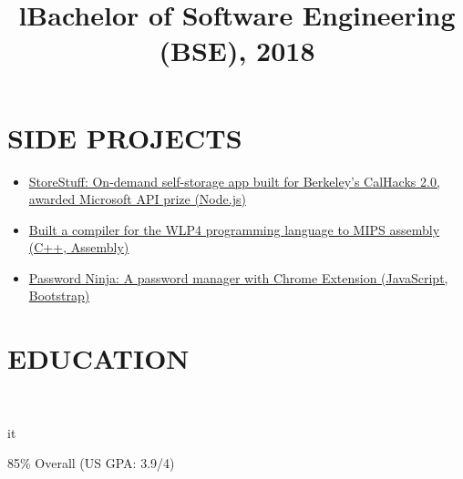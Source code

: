 \documentclass[]{res}
\begin{document}
\begin{resume}
\section{SIDE PROJECTS}
  \begin{itemize}
    \item \href{https://github.com/paulashbourne/storestuff}
      {StoreStuff: On-demand self-storage app built for Berkeley's CalHacks 2.0, awarded Microsoft API prize (Node.js)}
    \item \href{https://github.com/paulashbourne/wlp4compiler}
      {Built a compiler for the WLP4 programming language to MIPS assembly (C++, Assembly)}
    \item \href{http://password-ninja.com/}
      {Password Ninja: A password manager with Chrome Extension (JavaScript, Bootstrap)}
  \end{itemize}

\section{EDUCATION}
  \begin{format}  \\ \title{l}{it} \\ \body \end{format}
  \title{Bachelor of Software Engineering (BSE), 2018}
  \begin{position}
    85\% Overall (US GPA: 3.9/4)
  \end{position}
\end{resume}
\end{document}
